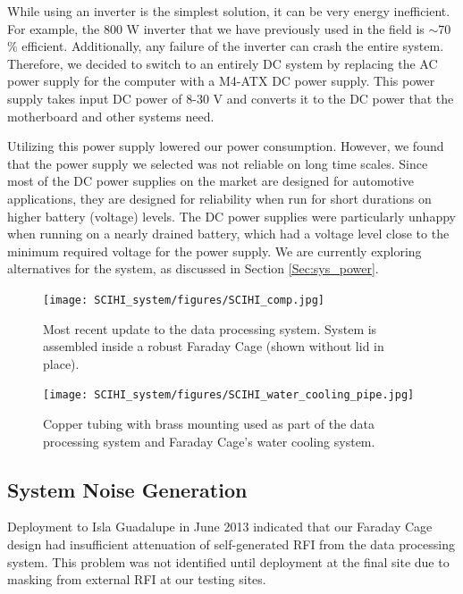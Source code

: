 While using an inverter is the simplest solution, it can be very energy inefficient. For example, the 800 W inverter that we have previously used in the field is $\sim70$\% efficient. Additionally, any failure of the inverter can crash the entire system. Therefore, we decided to switch to an entirely DC system by replacing the AC power supply for the computer with a M4-ATX DC power supply. This power supply takes input DC power of 8-30 V and converts it to the DC power that the motherboard and other systems need. 

Utilizing this power supply lowered our power consumption. However, we found that the power supply we selected was not reliable on long time scales. Since most of the DC power supplies on the market are designed for automotive applications, they are designed for reliability when run for short durations on higher battery (voltage) levels. The DC power supplies were particularly unhappy when running on a nearly drained battery, which had a voltage level close to the minimum required voltage for the power supply. We are currently exploring alternatives for the system, as discussed in Section \ref{Sec:sys_power}. 

\begin{figure}[htb]
\centering
\begin{minipage}[b]{0.52\textwidth}
\centering
\texttt{[image: SCIHI\_system/figures/SCIHI\_comp.jpg]}
\caption{Most recent update to the data processing system. System is assembled inside a robust Faraday Cage (shown without lid in place). }
\label{Fig:new_comp}
\end{minipage}%
\begin{minipage}[b]{0.02\textwidth}
\hspace{1cm}
\end{minipage}%
\begin{minipage}[b]{0.44\textwidth}
\centering
\texttt{[image: SCIHI\_system/figures/SCIHI\_water\_cooling\_pipe.jpg]}
\caption{Copper tubing with brass mounting used as part of the data processing system and Faraday Cage's water cooling system.}
\label{Fig:water_pipe}
\end{minipage}
\end{figure}


\subsection{System Noise Generation} \label{Sec:sys_noise}

Deployment to Isla Guadalupe in June 2013 indicated that our Faraday Cage design had insufficient attenuation of self-generated RFI from the data processing system. This problem was not identified until deployment at the final site due to masking from external RFI at our testing sites. 

